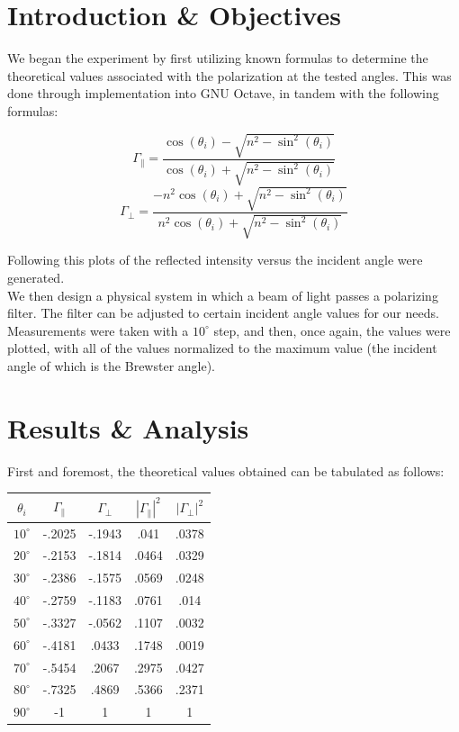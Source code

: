 \documentclass[
	letterpaper, %
	10pt, %
]{CSUniSchoolLabReport}
\begin{document}
\section{Introduction \& Objectives}

We began the experiment by first utilizing known formulas to determine the theoretical values associated with the polarization at the tested angles. This was done through implementation into GNU Octave, in tandem with the following formulas:

$$\Gamma_{\parallel}=\frac{\cos(\theta_i)-\sqrt{n^2-\sin^2(\theta_i)}}{\cos(\theta_i)+\sqrt{n^2-\sin^2(\theta_i)}}$$
$$\Gamma_{\perp}=\frac{-n^2\cos(\theta_i)+\sqrt{n^2-\sin^2(\theta_i)}}{n^2\cos(\theta_i)+\sqrt{n^2-\sin^2(\theta_i)}}$$

Following this plots of the reflected intensity versus the incident angle were generated.\\

We then design a physical system in which a beam of light passes a polarizing filter. The filter can be adjusted to certain incident angle values for our needs. Measurements were taken with a $10^{\circ}$ step, and then, once again, the values were plotted, with all of the values normalized to the maximum value (the incident angle of which is the Brewster angle).

\section{Results \& Analysis} 

First and foremost, the theoretical values obtained can be tabulated as follows:

\begin{center}
  \begin{tabular}[h!]{|c|c|c|c|c|}
    \hline
    $\theta_i$ & $\Gamma_{\parallel}$ & $\Gamma_{\perp}$ & $|\Gamma_{\parallel}|^2$ & $|\Gamma_{\perp}|^2$\\
    \hline
    $10^{\circ}$ & -.2025 & -.1943 & .041 & .0378\\
    \hline
    $20^{\circ}$ & -.2153 & -.1814 & .0464 & .0329\\
    \hline
    $30^{\circ}$ & -.2386 & -.1575 & .0569 & .0248\\
    \hline
    $40^{\circ}$ & -.2759 & -.1183 & .0761 & .014\\
    \hline
    $50^{\circ}$ & -.3327 & -.0562 & .1107 & .0032\\
    \hline
    $60^{\circ}$ & -.4181 & .0433 & .1748 & .0019\\
    \hline
    $70^{\circ}$ & -.5454 & .2067 & .2975 & .0427\\
    \hline
    $80^{\circ}$ & -.7325 & .4869 & .5366 & .2371\\
    \hline
    $90^{\circ}$ & -1 & 1 & 1 & 1\\
    \hline
  \end{tabular}
\end{center}
\end{document}
